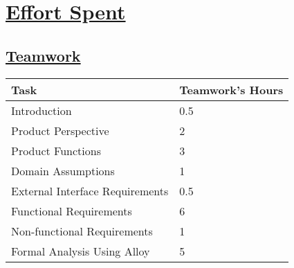 \section[Effort Spent]{\hyperlink{toc}{Effort Spent}}
\label{sec:effortSpent}

\subsection[Teamwork]{\hyperlink{toc}{Teamwork}}
\vspace{2mm}
\begin{center}
	\begin{tabular}{| l | p{} |}
		\hline
		\textbf{Task} & \textbf{Teamwork's Hours} \\ \hline
		Introduction & 0.5 \\ \hline
		Product Perspective & 2 \\ \hline
		Product Functions & 3 \\ \hline
		Domain Assumptions & 1 \\ \hline
		External Interface Requirements & 0.5 \\ \hline
		Functional Requirements & 6 \\ \hline
		Non-functional Requirements & 1 \\ \hline
		Formal Analysis Using Alloy & 5 \\
		\hline	
	\end{tabular}
\end{center}

